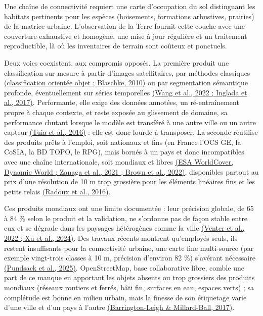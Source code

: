 \documentclass[a4paper,11pt]{report}
\begin{document}
Une chaîne de connectivité requiert une carte d'occupation du sol distinguant les habitats pertinents pour les espèces (boisements, formations arbustives, prairies) de la matrice urbaine. L'observation de la Terre fournit cette couche avec une couverture exhaustive et homogène, une mise à jour régulière et un traitement reproductible, là où les inventaires de terrain sont coûteux et ponctuels.

Deux voies coexistent, aux compromis opposés. La première produit une classification sur mesure à partir d'images satellitaires, par méthodes classiques \hyperref[sec:bibliographie]{(classification orientée objet ; Blaschke, 2010)} ou par segmentation sémantique profonde, éventuellement sur séries temporelles \hyperref[sec:bibliographie]{(Wang et al., 2022 ; Inglada et al., 2017)}. Performante, elle exige des données annotées, un ré-entraînement propre à chaque contexte, et reste exposée au glissement de domaine, sa performance chutant lorsque le modèle est transféré à une autre ville ou un autre capteur \hyperref[sec:bibliographie]{(Tuia et al., 2016)} : elle est donc lourde à transposer. La seconde réutilise des produits prêts à l'emploi, soit nationaux et fins (en France l'OCS GE, la CoSIA, la BD TOPO, le RPG), mais bornés à un pays et donc incompatibles avec une chaîne internationale, soit mondiaux et libres \hyperref[sec:bibliographie]{(ESA WorldCover, Dynamic World ; Zanaga et al., 2021 ; Brown et al., 2022)}, disponibles partout au prix d'une résolution de 10 m trop grossière pour les éléments linéaires fins et les petits relais \hyperref[sec:bibliographie]{(Radoux et al., 2016)}.

Ces produits mondiaux ont une limite documentée : leur précision globale, de 65 à 84 \% selon le produit et la validation, ne s'ordonne pas de façon stable entre eux et se dégrade dans les paysages hétérogènes comme la ville \hyperref[sec:bibliographie]{(Venter et al., 2022 ; Xu et al., 2024)}. Des travaux récents montrent qu'employés seuls, ils restent insuffisants pour la connectivité urbaine, une carte fine multi-source (par exemple vingt-trois classes à 10 m, précision d'environ 82 \%) s'avérant nécessaire \hyperref[sec:bibliographie]{(Pundsack et al., 2025)}. OpenStreetMap, base collaborative libre, comble une part de ce manque en apportant les objets absents ou trop grossiers des produits mondiaux (réseaux routiers et ferrés, bâti fin, surfaces en eau, espaces verts) ; sa complétude est bonne en milieu urbain, mais la finesse de son étiquetage varie d'une ville et d'un pays à l'autre \hyperref[sec:bibliographie]{(Barrington-Leigh \& Millard-Ball, 2017)}.
\end{document}
